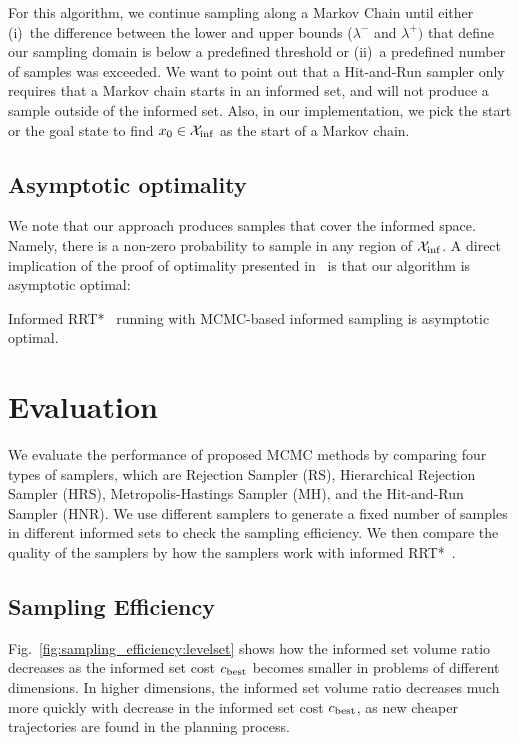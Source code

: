 \documentclass[letterpaper, 10 pt, conference]{ieeeconf}  %
\begin{document}
For this algorithm, we continue sampling along a Markov Chain until either 
(i)~the difference between the lower and upper bounds ($\lambda^-$ and $\lambda^+)$ 
that define our sampling domain is below a predefined threshold or
(ii)~a predefined number of samples was exceeded.
We want to point out that a Hit-and-Run sampler only requires that a Markov chain starts in an informed set, and will not produce a sample outside of the informed set.
Also, in our implementation, we pick the start or the goal state to find $ x_0 \in \mathcal{X}_{\rm {inf}} $ as the start of a Markov chain.



\subsection{Asymptotic optimality}
We note that our approach produces samples that cover the informed space. 
Namely, there is a non-zero probability to sample in any region of $\mathcal{X}_{\rm {inf}}$.
A direct implication of the proof of optimality presented in~\cite{KF11} is that our algorithm is asymptotic optimal:

\begin{prop}
	\label{prop:asym_opt}
	Informed RRT*~\cite{GSB14} running with MCMC-based informed sampling is asymptotic optimal.	
\end{prop}

\section{Evaluation}
\label{sec:eval}

We evaluate the performance of proposed MCMC methods by comparing four types of samplers, which are Rejection Sampler (RS), Hierarchical Rejection Sampler (HRS), Metropolis-Hastings Sampler (MH), and the Hit-and-Run Sampler (HNR).
We use different samplers to generate a fixed number of samples in different informed sets to check the sampling efficiency. %
We then compare the quality of the samplers by how the samplers work with informed RRT*~\cite{GSB14}.

\subsection{Sampling Efficiency}

Fig.~\ref{fig:sampling_efficiency:levelset} shows how the informed set volume ratio decreases as the informed set cost $ c_{\rm best} $ becomes smaller in problems of different dimensions.
In higher dimensions, the informed set volume ratio decreases much more quickly with decrease in the informed set cost $ c_{\rm best} $, as new cheaper trajectories are found in the planning process.
\end{document}
